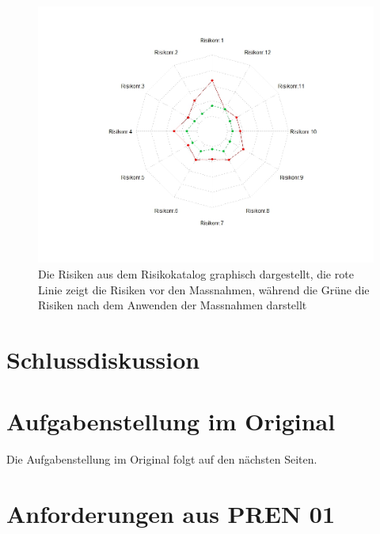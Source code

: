 \documentclass[a4paper]{report}
\begin{document}
\begin{figure}[h!]
	\centering
	\includegraphics[width=\textwidth,keepaspectratio]{Risikomatrix_Spinne}
	\caption{Die Risiken aus dem Risikokatalog graphisch dargestellt, die rote Linie zeigt die Risiken vor den Massnahmen, während die Grüne die Risiken nach dem Anwenden der Massnahmen darstellt}
	\label{fig:Risikomatrix_Spinne}
\end{figure}


\chapter{Schlussdiskussion}
\label{ch:SchlussDisku}

\listoffigures

\listoftables

\printbibliography

\appendix

\chapter{Aufgabenstellung im Original}
\label{app:ch:AufgabenOriginal}
Die Aufgabenstellung im Original folgt auf den nächsten Seiten.



\chapter{Anforderungen aus PREN 01}
\label{app:ch:Anforderungen}
\end{document}
